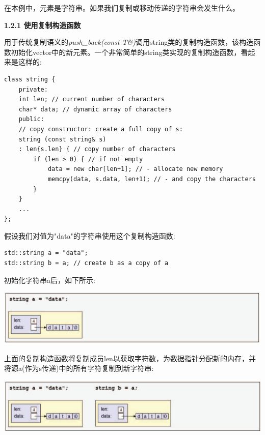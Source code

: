 在本例中，元素是字符串。如果我们复制或移动传递的字符串会发生什么。\par

\hspace*{\fill} \par %
\textbf{1.2.1 使用复制构造函数}

用于传统复制语义的\textit{push\_back(const T\&)}调用string类的复制构造函数，该构造函数初始化vector中的新元素。一个非常简单的string类实现的复制构造函数，看起来是这样的:\par

\begin{lstlisting}[caption={}]
class string {
	private:
	int len; // current number of characters
	char* data; // dynamic array of characters
	public:
	// copy constructor: create a full copy of s:
	string (const string& s)
	: len{s.len} { // copy number of characters
		if (len > 0) { // if not empty
			data = new char[len+1]; // - allocate new memory
			memcpy(data, s.data, len+1); // - and copy the characters
		}
	}
	...
};
\end{lstlisting}

假设我们对值为"data"的字符串使用这个复制构造函数:\par

\begin{lstlisting}[caption={}]
std::string a = "data";
std::string b = a; // create b as a copy of a
\end{lstlisting}

初始化字符串a后，如下所示:\par

\begin{center}
	\includegraphics[width=1.0\textwidth]{content/1/chapter1/images/18}
\end{center}

上面的复制构造函数将复制成员len以获取字符数，为数据指针分配新的内存，并将源a(作为s传递)中的所有字符复制到新字符串:\par

\begin{center}
	\includegraphics[width=1.0\textwidth]{content/1/chapter1/images/19}
\end{center}

